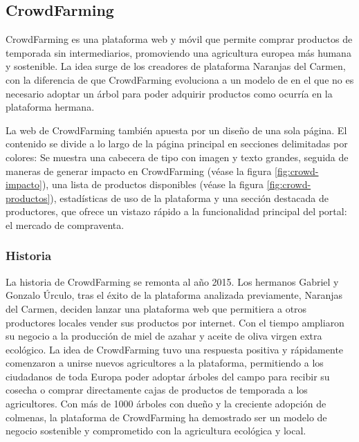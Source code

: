 
\subsection{CrowdFarming}

CrowdFarming es una plataforma web y móvil que permite comprar productos de temporada sin intermediarios, promoviendo una agricultura europea más humana y sostenible. La idea surge de los creadores de plataforma Naranjas del Carmen, con la diferencia de que CrowdFarming evoluciona a un modelo de  en el que no es necesario adoptar un árbol para poder adquirir productos como ocurría en la plataforma hermana.

La web de CrowdFarming también apuesta por un diseño de una sola página. El contenido se divide a lo largo de la página principal en secciones delimitadas por colores: Se muestra una cabecera de tipo  con imagen y texto grandes, seguida de maneras de generar impacto en CrowdFarming (véase la figura \ref{fig:crowd-impacto}), una lista de productos disponibles (véase la figura \ref{fig:crowd-productos}), estadísticas de uso de la plataforma y una sección destacada de productores, que ofrece un vistazo rápido a la funcionalidad principal del portal: el mercado de compraventa.



\subsubsection{Historia}

La historia de CrowdFarming se remonta al año 2015. Los hermanos Gabriel y Gonzalo Úrculo, tras el éxito de la plataforma analizada previamente, Naranjas del Carmen, deciden lanzar una plataforma web que permitiera a otros productores locales vender sus productos por internet. Con el tiempo ampliaron su negocio a la producción de miel de azahar y aceite de oliva virgen extra ecológico. La idea de CrowdFarming tuvo una respuesta positiva y rápidamente comenzaron a unirse nuevos agricultores a la plataforma, permitiendo a los ciudadanos de toda Europa poder adoptar árboles del campo para recibir su cosecha o comprar directamente cajas de productos de temporada a los agricultores. Con más de 1000 árboles con dueño y la creciente adopción de colmenas, la plataforma de CrowdFarming ha demostrado ser un modelo de negocio sostenible y comprometido con la agricultura ecológica y local.

